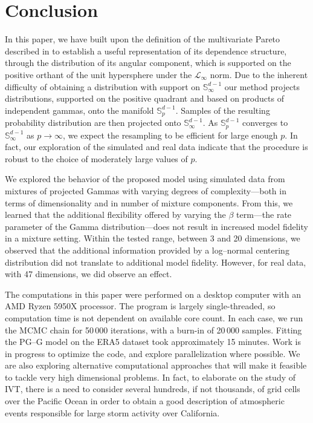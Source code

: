 \section{Conclusion\label{sec:conclusion}}
In this paper, we have built upon the definition of the multivariate Pareto described in \cite{ferreira2014}
  to establish a useful representation of its dependence structure, through
  the distribution of its angular component, which is supported on the positive orthant of the unit
  hypersphere under the $\mathcal{L}_{\infty}$ norm.  Due to the 
  inherent difficulty of obtaining a distribution with support on ${\mathbb S}^{d-1}_\infty$
  our method projects distributions, supported on the positive quadrant and
  based on products of independent gammas,  onto the manifold
  ${\mathbb S}_{p}^{d-1}$. Samples of the resulting probability distribution 
  are then projected onto ${\mathbb S}_{\infty}^{d-1}$.  
  As ${\mathbb S}_{p}^{d-1}$ converges to ${\mathbb S}_{\infty}^{d-1}$ as $
  p\to\infty$, we expect the resampling to be efficient for large enough
  $p$. In fact, our exploration of the simulated and real data indicate
  that the procedure is robust to the choice of moderately large values
  of $p$. 
 
We explored the behavior of the proposed model using simulated data from
    mixtures of projected Gammas with varying degrees of complexity---both in terms of dimensionality and 
    in number of mixture components.  From this, we learned that the additional flexibility 
    offered by varying the $\beta$ term---the rate parameter of the Gamma distribution---does not result 
    in increased model fidelity in a mixture setting.  Within the tested range, between 3 and 20 
    dimensions, we observed that the additional information provided by a log--normal 
    centering distribution did not translate to additional model fidelity.  However, for 
    real data, with 47 dimensions, we did observe an effect.
    
The computations in this paper were performed on a desktop computer with an AMD Ryzen 5950X processor.
  The program is largely single-threaded, so computation time is not dependent on available core count.  In each
  case, we run the MCMC chain for 50\,000 iterations, with a burn-in of 20\,000 samples.  Fitting the PG--G model
  on the ERA5 dataset took approximately 15 minutes.  Work is in progress to optimize the code, and explore
  parallelization where possible.  We are also exploring alternative computational approaches that will make it
  feasible to tackle very high dimensional problems. In fact, to elaborate on the study of IVT, there is a need 
  to consider several hundreds, if not thousands, of grid cells over the Pacific Ocean in order to obtain a 
  good description of atmospheric events responsible for large storm activity over California.


